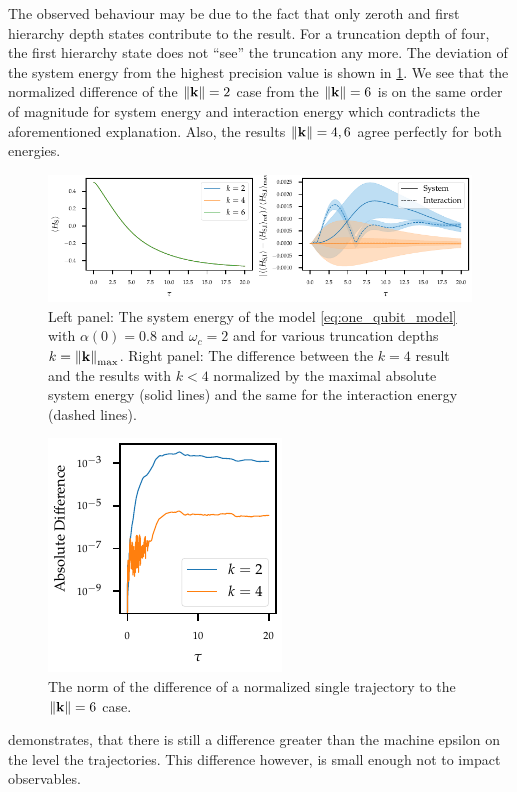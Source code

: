 The observed behaviour may be due to the fact that only zeroth and
first hierarchy depth states contribute to the result. For a
truncation depth of four, the first hierarchy state does not ``see''
the truncation any more. The deviation of the system energy from the
highest precision value is shown in
\cref{fig:k_systematics_system}. We see that the normalized difference
of the \(\norm{\vb{k}} = 2\) case from the \(\norm{\vb{k}} = 6\) is on
the same order of magnitude for system energy and interaction energy
which contradicts the aforementioned explanation. Also, the results
\(\norm{\vb{k}} = 4,6\) agree perfectly for both energies.
\begin{figure}[h]
  \centering
  \includegraphics{figs/one_bath_syst/k_systematics_system}
  \caption{\label{fig:k_systematics_system} Left panel: The system
    energy of the model \cref{eq:one_qubit_model} with \(α(0)=0.8\)
    and \(ω_c=2\) and for various truncation depths
    \(k=\norm{\vb{k}}_{\mathrm{max}}\). Right panel: The difference between
    the \(k=4\) result and the results with \(k<4\) normalized by the
    maximal absolute system energy (solid lines) and the same for the
    interaction energy (dashed lines).}
\end{figure}

\begin{figure}
  \centering
  \includegraphics{figs/one_bath_syst/trajectories_not_same}
  \caption{\label{fig:notsame} The norm of the difference of a
    normalized single trajectory to the \(\norm{\vb{k}} = 6\) case.}
\end{figure}
 demonstrates, that there is still a difference
greater than the machine epsilon on the level the trajectories. This
difference however, is small enough not to impact observables.

